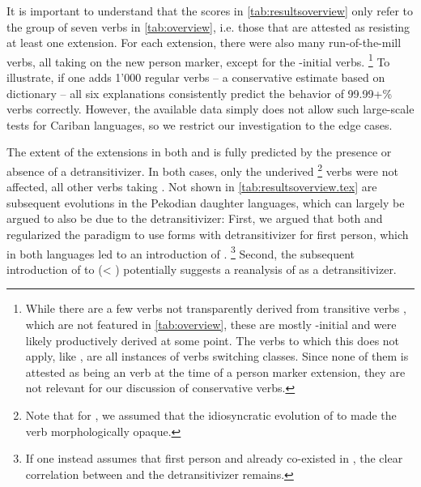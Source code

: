 





It is important to understand that the scores in \cref{tab:resultsoverview} only refer to the group of seven verbs in \cref{tab:overview}, i.e. those that are attested as resisting at least one extension.
For each extension, there were also many run-of-the-mill  verbs, all taking on the new person marker, except for the \akuriyo {}-initial verbs.%
\footnote{While there are a few  verbs not transparently derived from transitive verbs \parencites[252]{triomeira1999}[222]{meira2000split}[30]{gildea2007greenberg}, which are not featured in \cref{tab:overview}, these are mostly -initial and were likely productively derived at some point.
The verbs to which this does not apply, like \trio {}  \parencites[252]{triomeira1999}, are all instances of  verbs switching classes.
Since none of them is attested as being an  verb at the time of a person marker extension, they are not relevant for our discussion of conservative verbs.}
To illustrate, if one adds 1'000 regular  verbs -- a conservative estimate based on  \kalina dictionary -- all six explanations consistently predict the behavior of 99.99+\% verbs correctly.
However, the available data simply does not allow such large-scale tests for Cariban languages, so we restrict our investigation to the edge cases.


%

The extent of the extensions in both \PWai and \PPek is fully predicted by the presence or absence of a detransitivizer.
In both cases, only the underived%
\footnote{Note that for \PPek, we assumed that the idiosyncratic evolution of   to   made the verb morphologically opaque.}
  verbs were not affected, all other  verbs taking .
Not shown in \cref{tab:resultsoverview.tex} are subsequent evolutions in the Pekodian daughter languages, which can largely be argued to also be due to the detransitivizer:
First, we argued that both \ikpeng and \bakairi regularized the paradigm to use forms with detransitivizer for first person, which in both languages led to an introduction of .%
\footnote{If one instead assumes that first person  and  already co-existed in \PPek, the clear correlation between  and the detransitivizer remains.}
Second, the subsequent introduction of  to \ikpeng {}  (< ) potentially suggests a reanalysis of  as a detransitivizer.


